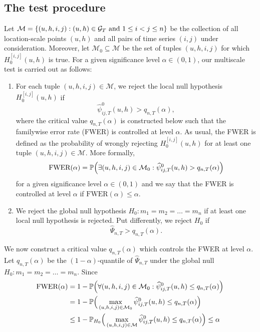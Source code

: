 \documentclass[12pt]{article}
\begin{document}
\subsection{The test procedure}\label{subsec:test:test}


Let $\mathcal{M} = \{ (u,h,i,j): (u,h) \in \mathcal{G}_T \text{ and } 1 \le i < j \le n \}$ be the collection of all location-scale points $(u,h)$ and all pairs of time series $(i,j)$ under consideration. Moreover, let $\mathcal{M}_0 \subseteq \mathcal{M}$ be the set of tuples $(u,h,i,j)$ for which $H_0^{[i, j]}(u, h)$ is true.
For a given significance level $\alpha \in (0,1)$, our multiscale test is carried out as follows: 
\begin{enumerate}[label=(\roman*),leftmargin=0.75cm,itemsep=0pt,parsep=0pt,topsep=3pt]

\item For each tuple $(u,h,i,j) \in \mathcal{M}$, we reject the local null hypothesis $H_0^{[i, j]}(u, h)$ if 
\[ \widehat{\psi}^0_{ij, T}(u, h) > q_{n,T}(\alpha), \]
where the critical value $q_{n,T}(\alpha)$ is constructed below such that the familywise error rate (FWER) is controlled at level $\alpha$. As usual, the FWER is defined as the probability of wrongly rejecting $H_0^{[i, j]}(u, h)$ for at least one tuple $(u,h,i,j) \in \mathcal{M}$. More formally, 
\[ \text{FWER}(\alpha) = \mathbb{P} \Big( \exists (u,h,i,j) \in \mathcal{M}_0 : \widehat{\psi}^0_{ij, T}(u, h) > q_{n,T}(\alpha) \Big) \]
for a given significance level $\alpha \in (0,1)$ and we say that the FWER is controlled at level $\alpha$ if $\text{FWER}(\alpha) \le \alpha$.

\item We reject the global null hypothesis $H_0: m_1 = m_2 = \ldots = m_n$ if at least one local null hypothesis is rejected. Put differently, we reject $H_0$ if 
\[ \widehat{\Psi}_{n,T} > q_{n,T}(\alpha). \]

\end{enumerate}
We now construct a critical value $q_{n,T}(\alpha)$ which controls the FWER at level $\alpha$. Let $q_{n,T}(\alpha)$ be the $(1-\alpha)$-quantile of $\widehat{\Psi}_{n,T}$ under the global null $H_0: m_1 = m_2 = \ldots = m_n$. Since
\begin{align*} 
\text{FWER}(\alpha)
 & = 1 - \mathbb{P} \Big( \forall (u,h,i,j) \in \mathcal{M}_0 : \widehat{\psi}^0_{ij, T}(u, h) \le q_{n,T}(\alpha) \Big) \\
 & = 1 - \mathbb{P} \Big( \max_{ (u,h,i,j) \in \mathcal{M}_0} \widehat{\psi}^0_{ij, T}(u, h) \le q_{n,T}(\alpha) \Big) \\
 & \le 1 - \mathbb{P}_{H_0} \Big( \max_{ (u,h,i,j) \in \mathcal{M}} \widehat{\psi}^0_{ij, T}(u, h) \le q_{n,T}(\alpha) \Big) \le \alpha 
\end{align*}
\end{document}
